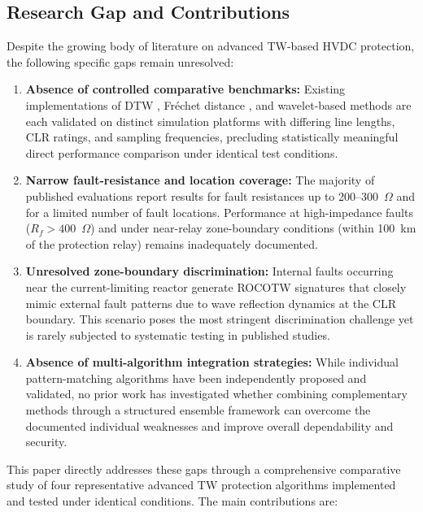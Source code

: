 \documentclass[journal]{IEEEtran}
\begin{document}
\subsection{Research Gap and Contributions}

Despite the growing body of literature on advanced TW-based HVDC protection, the following specific gaps remain unresolved:

\begin{enumerate}
    \item \textbf{Absence of controlled comparative benchmarks:} Existing implementations of DTW \cite{dtw1}, Fréchet distance \cite{reference_paper_frechet}, and wavelet-based methods \cite{wavelet1, wavelet2} are each validated on distinct simulation platforms with differing line lengths, CLR ratings, and sampling frequencies, precluding statistically meaningful direct performance comparison under identical test conditions.

    \item \textbf{Narrow fault-resistance and location coverage:} The majority of published evaluations report results for fault resistances up to 200--300~$\Omega$ and for a limited number of fault locations. Performance at high-impedance faults ($R_f > 400$~$\Omega$) and under near-relay zone-boundary conditions (within 100~km of the protection relay) remains inadequately documented.

    \item \textbf{Unresolved zone-boundary discrimination:} Internal faults occurring near the current-limiting reactor generate ROCOTW signatures that closely mimic external fault patterns due to wave reflection dynamics at the CLR boundary. This scenario poses the most stringent discrimination challenge yet is rarely subjected to systematic testing in published studies.

    \item \textbf{Absence of multi-algorithm integration strategies:} While individual pattern-matching algorithms have been independently proposed and validated, no prior work has investigated whether combining complementary methods through a structured ensemble framework can overcome the documented individual weaknesses and improve overall dependability and security.
\end{enumerate}

This paper directly addresses these gaps through a comprehensive comparative study of four representative advanced TW protection algorithms implemented and tested under identical conditions. The main contributions are:
\end{document}
